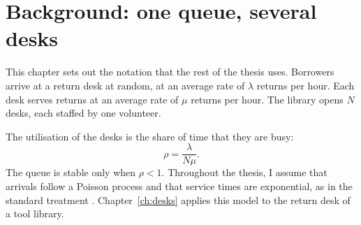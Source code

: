 \chapter{Background: one queue, several desks}
\label{ch:background}

This chapter sets out the notation that the rest of the thesis uses.
Borrowers arrive at a return desk at random, at an average rate of $\lambda$ returns per hour.
Each desk serves returns at an average rate of $\mu$ returns per hour.
The library opens $N$ desks, each staffed by one volunteer.

The utilisation of the desks is the share of time that they are busy:
\begin{equation}
  \rho = \frac{\lambda}{N\mu}.
  \label{eq:rho}
\end{equation}
The queue is stable only when $\rho < 1$.
Throughout the thesis, I assume that arrivals follow a Poisson process and that service times are exponential, as in the standard treatment \cite{example2021}.
Chapter~\ref{ch:desks} applies this model to the return desk of a tool library.
